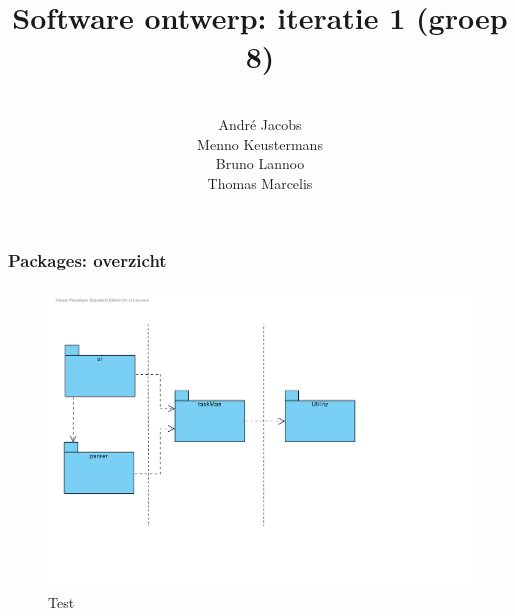 \documentclass{beamer}
\title[Software ontwerp: iteratie 1]{Software ontwerp: iteratie 1 (groep 8)} %
\author[Groep 8]{\\
        Andr\'e Jacobs \\
        Menno Keustermans\\
        Bruno Lannoo \\
        Thomas Marcelis} %
\institute[KULeuven] %
{\\ %
\medskip
\textit{} %
}
\date{} %
\begin{document}
\begin{frame}
\titlepage %
\end{frame}



%       

\begin{frame}
\frametitle {Packages: overzicht}
\begin{figure}
\centering
\includegraphics[width=1\textwidth]{figures/package_overview}
\caption{Test}
\end{figure}
\end{frame}

%
%
%
\end{document}
